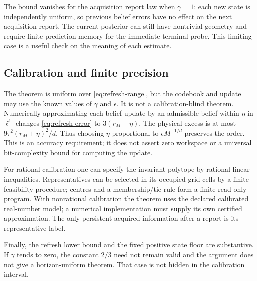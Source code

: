 The bound vanishes for the acquisition report law when $\gamma=1$:
each new state is independently uniform, so previous belief errors have
no effect on the next acquisition report. The current posterior can still
have nontrivial geometry and require finite prediction memory for the
immediate terminal probe. This limiting case is a useful check on the
meaning of each estimate.

\subsection{Calibration and finite precision}
The theorem is uniform over \eqref{eq:refresh-range}, but the codebook and
update may use the known values of $\gamma$ and $\epsilon$. It is not a
calibration-blind theorem. Numerically approximating each belief update by
an admissible belief within $\eta$ in $\ell^1$ changes
\eqref{eq:refresh-error} to $3(r_M+\eta)$. The physical excess is at most
$9\tau^2(r_M+\eta)^2/d$. Thus choosing $\eta$ proportional to
$\epsilon M^{-1/d}$ preserves the order. This is an accuracy requirement;
it does not assert zero workspace or a universal bit-complexity bound for
computing the update.

For rational calibration one can specify the invariant polytope by rational
linear inequalities. Representatives can be selected in its occupied grid
cells by a finite feasibility procedure; centres and a membership/tie rule
form a finite read-only program. With nonrational calibration the theorem
uses the declared calibrated real-number model; a numerical implementation
must supply its own certified approximation. The only persistent acquired
information after a report is its representative label.

Finally, the refresh lower bound and the fixed positive state floor are
substantive. If $\gamma$ tends to zero, the constant $2/3$ need not remain
valid and the argument does not give a horizon-uniform theorem. That case
is not hidden in the calibration interval.
